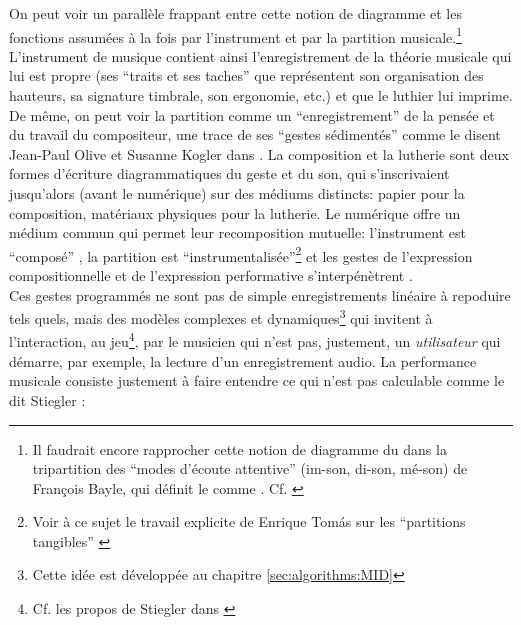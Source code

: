 \indent On peut voir un parallèle frappant entre cette notion de diagramme et les fonctions assumées à la fois par l'instrument et par la partition musicale.\footnote{Il faudrait encore rapprocher cette notion de diagramme du  dans la tripartition des ``modes d'écoute attentive'' (im-son, di-son, mé-son) de François Bayle, qui définit le  comme . Cf. \cite{bayle_musique_1993}} L'instrument de musique contient ainsi l'enregistrement de la théorie musicale qui lui est propre (ses ``traits et ses taches'' que représentent son organisation des hauteurs, sa signature timbrale, son ergonomie, etc.) et que le luthier lui imprime. De même, on peut voir la partition comme un ``enregistrement'' de la pensée et du travail du compositeur, une trace de ses ``gestes sédimentés'' comme le disent Jean-Paul Olive et Susanne Kogler dans \cite{olive_expression_2013}. La composition et la lutherie sont deux formes d’écriture diagrammatiques du geste et du son, qui s’inscrivaient jusqu’alors (avant le numérique) sur des médiums distincts: papier pour la composition, matériaux physiques pour la lutherie. Le numérique offre un médium commun qui permet leur recomposition mutuelle: l'instrument est ``composé'' \cite{schnell_introducing_2002}, la partition est ``instrumentalisée''\footnote{Voir à ce sujet le travail explicite de Enrique Tomás sur les ``partitions tangibles'' \cite{tomas_tangible_2014}} et les gestes de l'expression compositionnelle et de l'expression performative s'interpénètrent \cite{dobrian_e_2006}.\\
\indent Ces gestes programmés ne sont pas de simple enregistrements linéaire à repoduire tels quels, mais des modèles complexes et dynamiques\footnote{Cette idée est développée au chapitre \ref{sec:algorithms:MID}} qui invitent à l'interaction, au jeu\footnote{Cf. les propos de Stiegler dans \cite{stiegler_circuit_2004} }, par le musicien qui n'est pas, justement, un \textit{utilisateur} qui démarre, par exemple, la lecture d'un enregistrement audio. La performance musicale consiste justement à faire entendre ce qui n'est pas calculable comme le dit Stiegler \cite{stiegler_circuit_2004}: \\
